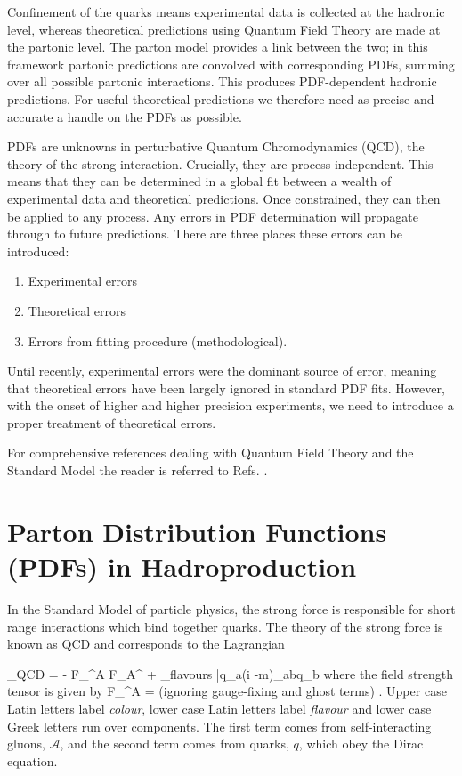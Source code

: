 Confinement of the quarks means experimental data is collected at the hadronic level, whereas theoretical predictions using Quantum Field Theory are made at the partonic level. The parton model provides a
link between the two; in this framework partonic predictions
are convolved with corresponding PDFs, summing over all possible partonic interactions. This produces PDF-dependent
hadronic predictions. For useful theoretical predictions we therefore need as precise and accurate a handle on the PDFs as possible.

PDFs are unknowns in perturbative Quantum Chromodynamics (QCD), the theory of
the strong interaction. Crucially, they are process independent. This means that
they can be determined in a global fit between a wealth of experimental data and
theoretical predictions. Once constrained, they can then be applied to any process. Any errors in PDF determination will propagate through to future predictions. There are three
places these errors can be introduced:
\begin{enumerate}
\item Experimental errors
\item Theoretical errors
\item Errors from fitting procedure (methodological).
\end{enumerate}
Until recently, experimental errors were the dominant source of error, meaning that theoretical
errors have been largely ignored in standard PDF fits.
However, with the onset of higher and higher precision experiments, we need to introduce a proper
treatment of theoretical errors.

For comprehensive references dealing with Quantum Field Theory and the Standard
Model the reader is referred to Refs. \cite{ob:ellis}\cite{Peskin:1995ev}\cite{Burgess:2007zi}\cite{Srednicki:1019751}.

\section{Parton Distribution Functions (PDFs) in Hadroproduction}

In the Standard Model of particle physics, the strong force is responsible for short range interactions
which bind together quarks. The theory of the strong force is known as QCD
and corresponds to the Lagrangian

\beq
  _{QCD} = -  F_{\alpha \beta}^A F_A^{\alpha \beta} + \sum_{flavours} \bar{q}_a(i -m)_{ab}q_b
\eeq
where the field strength tensor is given by
\beq
  F_{\alpha \beta}^A = 
\eeq
(ignoring gauge-fixing and ghost terms) \cite{ob:ellis}. Upper case Latin letters label
\textit{colour}, lower case Latin letters label \textit{flavour} and lower case Greek letters
run over components. The first term comes from self-interacting gluons,
$\mathcal{A}$, and the second term comes from quarks, $q$, which obey the Dirac equation.

